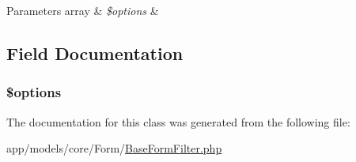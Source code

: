 \begin{DoxyParams}[1]{Parameters}
array & {\em \$options} & \\
\hline
\end{DoxyParams}


\subsection{Field Documentation}
\hypertarget{classapp_1_1models_1_1core_1_1_form_1_1_base_form_filter_a011800c63ece4cbbfa77136a20607023}{
\subsubsection[{\$options}]{\setlength{\rightskip}{0pt plus 5cm}\$options\hspace{0.3cm}{\ttfamily [protected]}}}\label{classapp_1_1models_1_1core_1_1_form_1_1_base_form_filter_a011800c63ece4cbbfa77136a20607023}


The documentation for this class was generated from the following file\-:\begin{DoxyCompactItemize}
\item 
app/models/core/\-Form/\hyperlink{_base_form_filter_8php}{Base\-Form\-Filter.\-php}\end{DoxyCompactItemize}
